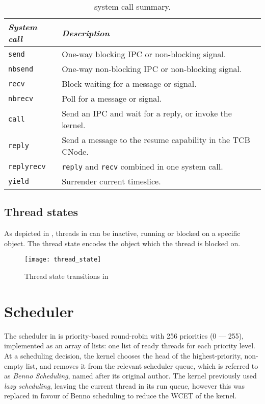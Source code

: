 \begin{table} 
    \centering
    \begin{tabular}{lp{}}\toprule
        \emph{System call} & \emph{Description} \\\midrule
        \texttt{send}      & One-way blocking \gls{IPC} or non-blocking signal.\\
        \texttt{nbsend}    & One-way non-blocking \gls{IPC} or non-blocking signal.\\
        \texttt{recv}      & Block waiting for a message or signal. \\
        \texttt{nbrecv}    & Poll for a message or signal. \\
        \texttt{call}      & Send an IPC and wait for a reply, or invoke the kernel. \\
        \texttt{reply}     & Send a message to the resume capability in the TCB CNode.\\
        \texttt{replyrecv} & \texttt{reply} and \texttt{recv} combined in one system call.\\
        \texttt{yield}     & Surrender current timeslice. \\
        \bottomrule
    \end{tabular}
    \caption{\selfour system call summary.}
    \label{t:system-calls}
\end{table}

\subsection{Thread states}

As depicted in , threads in \selfour can be inactive, running or blocked on a
specific object. The thread state encodes the object which the thread is blocked on. 

\begin{figure}[h!tb]
    \centering
    \texttt{[image: thread\_state]}
    \caption{Thread state transitions in \selfour}
    \label{f:thread_state}
\end{figure}


\section{Scheduler}

The scheduler in \selfour is priority-based round-robin with 256 priorities (0 --- 255), implemented as an array of lists: one list of ready threads for each priority level. 
At a scheduling decision, the kernel chooses the head of the highest-priority, non-empty list, and
removes it from the relevant scheduler queue, which is referred to as \emph{Benno Scheduling}, named
after its original author.
The kernel previously used \emph{lazy scheduling}, leaving the current thread in its run queue, however this was replaced in favour of Benno scheduling to reduce the WCET of the kernel. 

